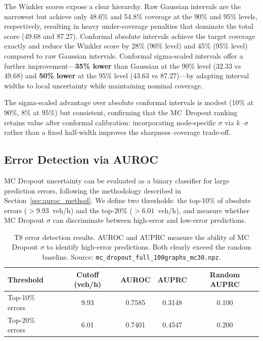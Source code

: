The Winkler scores expose a clear hierarchy. Raw Gaussian intervals are the narrowest but achieve only 48.6\% and 54.8\% coverage at the 90\% and 95\% levels, respectively, resulting in heavy under-coverage penalties that dominate the total score (49.68 and 87.27). Conformal absolute intervals achieve the target coverage exactly and reduce the Winkler score by 28\% (90\% level) and 45\% (95\% level) compared to raw Gaussian intervals. Conformal sigma-scaled intervals offer a further improvement---\textbf{35\% lower} than Gaussian at the 90\% level (32.33 vs 49.68) and \textbf{50\% lower} at the 95\% level (43.63 vs 87.27)---by adapting interval widths to local uncertainty while maintaining nominal coverage.

The sigma-scaled advantage over absolute conformal intervals is modest (10\% at 90\%, 8\% at 95\%) but consistent, confirming that the MC~Dropout ranking retains value after conformal calibration: incorporating node-specific $\sigma$ via $k \cdot \sigma$ rather than a fixed half-width improves the sharpness--coverage trade-off.

\subsection{Error Detection via AUROC}\label{sec:error_detection}

MC Dropout uncertainty can be evaluated as a binary classifier for large prediction errors, following the methodology described in Section~\ref{sec:auroc_method}. We define two thresholds: the top-10\% of absolute errors ($> 9.93$~veh/h) and the top-20\% ($> 6.01$~veh/h), and measure whether MC Dropout $\sigma$ can discriminate between high-error and low-error predictions.

\begin{table}[htbp]
\centering
\caption[T8 error detection: AUROC and AUPRC for MC Dropout uncertainty]{T8 error detection results. AUROC and AUPRC measure the ability of MC Dropout $\sigma$ to identify high-error predictions. Both clearly exceed the random baseline. Source: \texttt{mc\_dropout\_full\_100graphs\_mc30.npz}.}
\label{tab:error_detection_t8}
\begin{tabular}{lcccc}
\toprule
\textbf{Threshold} & \textbf{Cutoff (veh/h)} & \textbf{AUROC} & \textbf{AUPRC} & \textbf{Random AUPRC} \\
\midrule
Top-10\% errors & 9.93 & 0.7585 & 0.3148 & 0.100 \\
Top-20\% errors & 6.01 & 0.7401 & 0.4547 & 0.200 \\
\bottomrule
\end{tabular}
\end{table}

